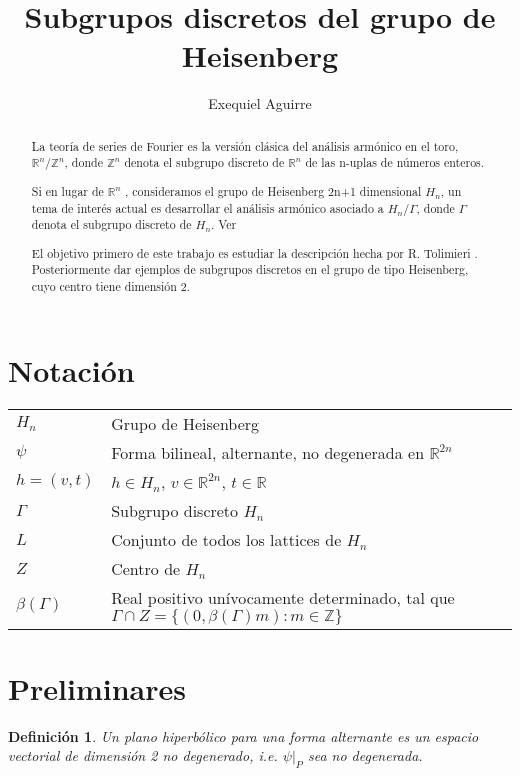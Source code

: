 \documentclass[12pt]{article}
\author{Exequiel Aguirre}
\title{Subgrupos discretos del grupo de Heisenberg }
\date{}
\newtheorem{definition}{Definición}
\begin{document}
\maketitle

\begin{abstract}
La teoría de series de Fourier es la versión clásica del análisis armónico en el toro,
$\mathbb{R}^n /\mathbb{Z}^n$, donde $\mathbb{Z}^n$ denota el subgrupo discreto de $\mathbb{R}^n$ de
las n-uplas de números enteros.

Si en lugar de $\mathbb{R}^n$ , consideramos el grupo de Heisenberg 2n+1 dimensional $H_n$, un tema
de interés actual es desarrollar el análisis armónico asociado a $H_n/\Gamma$, donde $\Gamma$ 
denota el subgrupo discreto de $H_n$. Ver \cite{Th} 

El objetivo primero de este trabajo es estudiar la descripción hecha por R. Tolimieri \cite{To}.
Posteriormente dar ejemplos de subgrupos discretos en el grupo de tipo Heisenberg, cuyo centro tiene
dimensión 2.

\end{abstract}

\section{Notación}
\begin{tabular}{ l l }
  $H_n$ & Grupo de Heisenberg \\
  $\psi$ & Forma bilineal, alternante, no degenerada  en $\mathbb{R}^{2n}$ \\
  $h=(v,t)$ & $h \in H_n$, $v \in \mathbb{R}^{2n}$, $t \in \mathbb{R}$ \\
  $\Gamma$ & Subgrupo discreto $H_n$ \\
  $L$ & Conjunto de todos los lattices de $H_n$ \\
  $Z$ & Centro de $H_n$ \\
  $\beta(\Gamma)$ & Real positivo unívocamente determinado, tal que $\Gamma \cap Z =\{(0,\beta(\Gamma) m): m\in \mathbb{Z} \}$ \\
\end{tabular}


 

\section{Preliminares}
\begin{definition} 
 Un plano hiperbólico para una forma alternante es un espacio vectorial de dimensión 2 no degenerado,
  i.e. $\psi|_P$ sea no degenerada. 
\end{definition}
\end{document}
